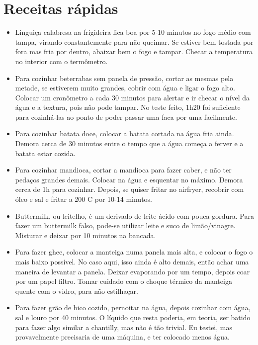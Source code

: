 \section{Receitas rápidas}

\begin{itemize}
	\item Linguiça calabresa na frigideira fica boa por 5-10 minutos no fogo médio com tampa, virando
	      constantemente para não queimar. Se estiver bem tostada por fora mas fria por dentro, abaixar bem o fogo e
	      tampar. Checar a temperatura no interior com o termômetro.
	\item Para cozinhar beterrabas sem panela de pressão, cortar as mesmas pela metade, se estiverem muito
	      grandes, cobrir com água e ligar o fogo alto. Colocar um cronômetro a cada 30 minutos para alertar e ir
	      checar o nível da água e a textura, pois não pode tampar. No teste feito, 1h20 foi suficiente para
	      cozinhá-las ao ponto de poder passar uma faca por uma facilmente.
	\item Para cozinhar batata doce, colocar a batata cortada na água fria ainda. Demora cerca de 30 minutos
	      entre o tempo que a água começa a ferver e a batata estar cozida.
	\item Para cozinhar mandioca, cortar a mandioca para fazer caber, e não ter pedaços grandes demais.
	      Colocar na água e esquentar no máximo. Demora cerca de 1h para cozinhar. Depois, se quiser fritar no
	      airfryer, recobrir com óleo e sal e fritar a 200 \grau C por 10-14 minutos.
	\item Buttermilk, ou leitelho, é um derivado de leite ácido com pouca gordura. Para fazer um buttermilk
	      falso, pode-se utilizar leite e suco de limão/vinagre. Misturar e deixar por 10 minutos na bancada.
	\item Para fazer ghee, colocar a manteiga numa panela mais alta, e colocar o fogo o mais baixo possível. No
	      caso aqui, isso ainda é alto demais, então achar uma maneira de levantar a panela. Deixar evaporando por
	      um tempo, depois coar por um papel filtro. Tomar cuidado com o choque térmico da manteiga quente com o
	      vidro, para não estilhaçar.
	\item Para fazer grão de bico cozido, pernoitar na água, depois cozinhar com água, sal e louro por 40
	      minutos. O líquido que resta poderia, em teoria, ser batido para fazer algo similar a chantilly, mas
	      não é tão trivial. Eu testei, mas provavelmente precisaria de uma máquina, e ter colocado menos água.
\end{itemize}
\clearpage

